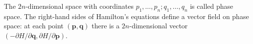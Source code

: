 The $2n$-dimensional space with coordinates $p_1, \ldots, p_n; q_1, \ldots, q_n$ is called phase space. The right-hand sides of Hamilton's equations define a vector field on phase space: at each point $(\mathbf{p}, \mathbf{q})$ there is a $2n$-dimensional vector $(-\partial H/\partial \mathbf{q}, \partial H/\partial \mathbf{p})$.